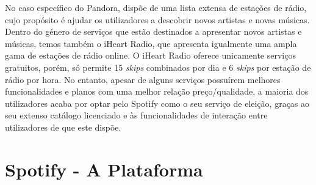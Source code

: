 No caso específico do Pandora, dispõe de uma lista extensa de estações de rádio, cujo propósito é ajudar os utilizadores a descobrir novos artistas e novas músicas. Dentro do género de serviços que estão destinados a apresentar novos artistas e músicas, temos também o iHeart Radio, que apresenta igualmente uma ampla gama de estações de rádio online. O iHeart Radio oferece unicamente serviços gratuitos, porém, só permite 15 \textit{skips} combinados por dia e 6 \textit{skips} por estação de rádio por hora.
No entanto, apesar de alguns serviços possuírem melhores funcionalidades e planos com uma melhor relação preço/qualidade, a maioria dos utilizadores acaba por optar pelo Spotify como o seu serviço de eleição, graças ao seu extenso catálogo licenciado e às funcionalidades de interação entre utilizadores de que este dispõe.   



\chapter{Spotify - A Plataforma}
\label{plataforma}

